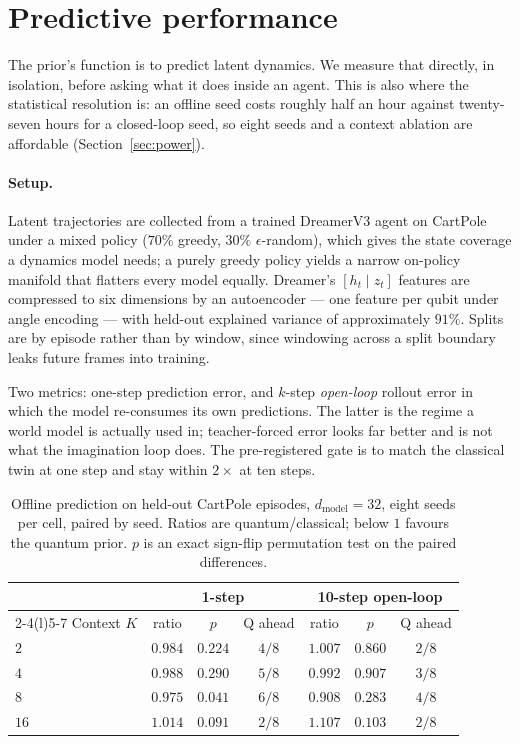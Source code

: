 \documentclass[11pt,onecolumn]{article}
\begin{document}
\section{Predictive performance}\label{sec:offline}
The prior's function is to predict latent dynamics. We measure that
directly, in isolation, before asking what it does inside an agent.
This is also where the statistical resolution is: an offline seed costs
roughly half an hour against twenty-seven hours for a closed-loop seed,
so eight seeds and a context ablation are affordable
(Section~\ref{sec:power}).

\paragraph{Setup.}
Latent trajectories are collected from a trained DreamerV3 agent on
CartPole under a mixed policy ($70\%$ greedy, $30\%$
$\epsilon$-random), which gives the state coverage a dynamics model
needs; a purely greedy policy yields a narrow on-policy manifold that
flatters every model equally. Dreamer's $[h_t \mid z_t]$ features are
compressed to six dimensions by an autoencoder --- one feature per
qubit under angle encoding --- with held-out explained variance of
approximately $91\%$. Splits are by episode rather than by window, since
windowing across a split boundary leaks future frames into training.

Two metrics: one-step prediction error, and $k$-step \emph{open-loop}
rollout error in which the model re-consumes its own predictions. The
latter is the regime a world model is actually used in; teacher-forced
error looks far better and is not what the imagination loop does. The
pre-registered gate is to match the classical twin at one step and stay
within $2\times$ at ten steps.

\begin{table}[htb]\centering\small
\caption{Offline prediction on held-out CartPole episodes,
$d_{\mathrm{model}} = 32$, eight seeds per cell, paired by seed. Ratios
are quantum/classical; below $1$ favours the quantum prior. $p$ is an
exact sign-flip permutation test on the paired differences.}
\label{tab:offline}
\begin{tabular}{lcccccc}
\toprule
& \multicolumn{3}{c}{1-step} & \multicolumn{3}{c}{10-step open-loop} \\
\cmidrule(lr){2-4}\cmidrule(l){5-7}
Context $K$ & ratio & $p$ & Q ahead & ratio & $p$ & Q ahead \\
\midrule
$2$  & $0.984$ & $0.224$ & $4/8$ & $1.007$ & $0.860$ & $2/8$ \\
$4$  & $0.988$ & $0.290$ & $5/8$ & $0.992$ & $0.907$ & $3/8$ \\
$8$  & $0.975$ & $0.041$ & $6/8$ & $0.908$ & $0.283$ & $4/8$ \\
$16$ & $1.014$ & $0.091$ & $2/8$ & $1.107$ & $0.103$ & $2/8$ \\
\bottomrule
\end{tabular}
\end{table}
\end{document}
